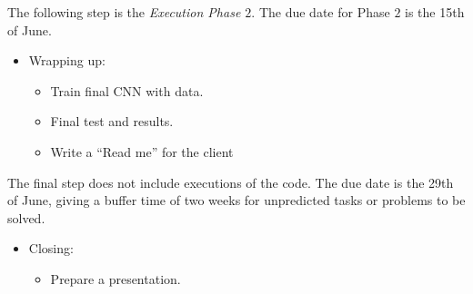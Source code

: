 \documentclass[]{article}
\begin{document}
The following step is the \textit{Execution Phase $2$}. The due date for Phase $2$ is the 15th of June.

\begin{itemize}

\item Wrapping up:
	\begin{itemize}
	\item Train final CNN with data.
	\item Final test and results.
	\item Write a ``Read me'' for the client
	\end{itemize}

\end{itemize}

The final step does not include executions of the code. The due date is the 29th of June, giving a buffer time of two weeks for unpredicted tasks or problems to be solved.

\begin{itemize}
\item Closing:
	\begin{itemize}
	\item Prepare a presentation.
	\end{itemize}

\end{itemize}
\end{document}
